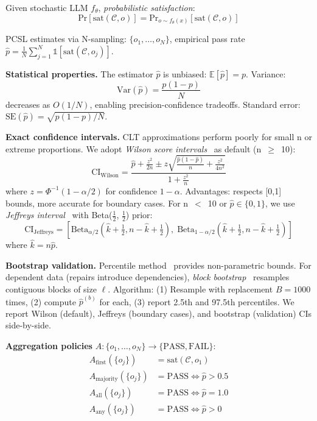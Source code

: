 \documentclass[sigconf]{acmart}
\begin{document}
Given stochastic LLM \( f_\theta \), \textit{probabilistic satisfaction}:
\[
\text{Pr}[\text{sat}(\mathcal{C}, o)] = \text{Pr}_{o \sim f_\theta(x)}[\text{sat}(\mathcal{C}, o)]
\]

PCSL estimates via N-sampling: \( \{o_1, \ldots, o_N\} \), empirical pass rate \( \hat{p} = \frac{1}{N}\sum_{j=1}^N \mathbb{1}[\text{sat}(\mathcal{C}, o_j)] \).

\textbf{Statistical properties.} The estimator \( \hat{p} \) is unbiased: \( \mathbb{E}[\hat{p}] = p \). Variance:
\[
\text{Var}(\hat{p}) = \frac{p(1-p)}{N}
\]
decreases as \( O(1/N) \), enabling precision-confidence tradeoffs. Standard error: \( \text{SE}(\hat{p}) = \sqrt{p(1-p)/N} \).

\textbf{Exact confidence intervals.} CLT approximations perform poorly for small n or extreme proportions. We adopt \textit{Wilson score intervals}~\cite{brown2001interval} as default (n~\(\geq\)~10):
\[
\text{CI}_{\text{Wilson}} = \frac{\hat{p} + \frac{z^2}{2n} \pm z\sqrt{\frac{\hat{p}(1-\hat{p})}{n} + \frac{z^2}{4n^2}}}{1 + \frac{z^2}{n}}
\]
where \( z = \Phi^{-1}(1 - \alpha/2) \) for confidence \( 1-\alpha \). Advantages: respects [0,1] bounds, more accurate for boundary cases. For n~\(<\)~10 or \(\hat{p} \in \{0, 1\}\), we use \textit{Jeffreys interval}~\cite{brown2001interval} with Beta(\(\frac{1}{2}\), \(\frac{1}{2}\)) prior:
\[
\text{CI}_{\text{Jeffreys}} = [\text{Beta}_{\alpha/2}(\hat{k}+\tfrac{1}{2}, n-\hat{k}+\tfrac{1}{2}), \; \text{Beta}_{1-\alpha/2}(\hat{k}+\tfrac{1}{2}, n-\hat{k}+\tfrac{1}{2})]
\]
where \(\hat{k} = n\hat{p}\).

\textbf{Bootstrap validation.} Percentile method~\cite{efron1994bootstrap} provides non-parametric bounds. For dependent data (repairs introduce dependencies), \textit{block bootstrap}~\cite{kunsch1989jackknife} resamples contiguous blocks of size \( \ell \). Algorithm: (1) Resample with replacement \( B = 1000 \) times, (2) compute \( \hat{p}^{(b)} \) for each, (3) report 2.5th and 97.5th percentiles. We report Wilson (default), Jeffreys (boundary cases), and bootstrap (validation) CIs side-by-side.

\textbf{Aggregation policies} \( A: \{o_1, \ldots, o_N\} \to \{\text{PASS}, \text{FAIL}\} \):
\begin{align*}
A_{\text{first}}(\{o_j\}) &= \text{sat}(\mathcal{C}, o_1) \\
A_{\text{majority}}(\{o_j\}) &= \text{PASS} \iff \hat{p} > 0.5 \\
A_{\text{all}}(\{o_j\}) &= \text{PASS} \iff \hat{p} = 1.0 \\
A_{\text{any}}(\{o_j\}) &= \text{PASS} \iff \hat{p} > 0
\end{align*}
\end{document}

